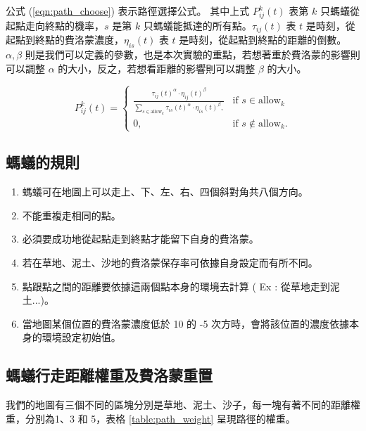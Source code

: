 \documentclass[sigconf]{acmart}
\begin{document}
公式 (\ref{eqn:path_choose}) 表示路徑選擇公式。	其中上式 $P^k_{ij}(t)$ 表第 $k$ 只螞蟻從起點走向終點的機率，$s$ 是第 $k$ 只螞蟻能抵達的所有點。$\tau_{ij}(t)$ 表 $t$ 是時刻，從起點到終點的費洛蒙濃度，$\eta_{is}(t)$ 表 $t$ 是時刻，從起點到終點的距離的倒數。$\alpha , \beta $ 則是我們可以定義的參數，也是本次實驗的重點，若想著重於費洛蒙的影響則可以調整 $\alpha$ 的大小，反之，若想看距離的影響則可以調整 $\beta$ 的大小。



\begin{equation}
  \label{eqn:path_choose}
P^k_{ij}(t) = \left\{\begin{array}{ll}
				\frac{\tau_{ij}(t)^\alpha \cdot \eta_{ij}(t)^\beta}{\sum_{s \in \text{allow}_k}  \tau_{is}(t)^\alpha \cdot \eta_{is}(t)^\beta,} & \text{if } s \in \text{allow}_k \\ 
                0, & \text{if } s \notin \text{allow}_k.
                \end{array} \right.
\end{equation}

\subsection{螞蟻的規則}

\begin{enumerate}[label=\textbf{\arabic*.}]
	\item 螞蟻可在地圖上可以走上、下、左、右、四個斜對角共八個方向。
	\item 不能重複走相同的點。
	\item 必須要成功地從起點走到終點才能留下自身的費洛蒙。
	\item 若在草地、泥土、沙地的費洛蒙保存率可依據自身設定而有所不同。
	\item 點跟點之間的距離要依據這兩個點本身的環境去計算 ( Ex : 從草地走到泥土...)。
	\item 當地圖某個位置的費洛蒙濃度低於 10 的 -5 次方時，會將該位置的濃度依據本身的環境設定初始值。
\end{enumerate}

\subsection{螞蟻行走距離權重及費洛蒙重置}

我們的地圖有三個不同的區塊分別是草地、泥土、沙子，每一塊有著不同的距離權重，分別為1、3 和 5，表格 \ref{table:path_weight} 呈現路徑的權重。
\end{document}
